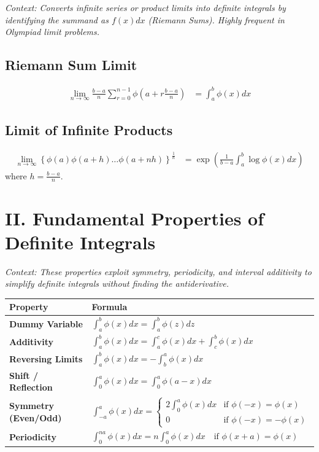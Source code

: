 \documentclass[11pt, a4paper]{article}
\begin{document}
\textit{\small Context: Converts infinite series or product limits into definite integrals by identifying the summand as $f(x)dx$ (Riemann Sums). Highly frequent in Olympiad limit problems.}

\subsection*{\color{secondary} Riemann Sum Limit}
\begin{align*}
    \lim_{n \to \infty} \frac{b-a}{n} \sum_{r=0}^{n-1} \phi\left(a + r\frac{b-a}{n}\right) &= \int_a^b \phi(x) dx
\end{align*}

\subsection*{\color{secondary} Limit of Infinite Products}
\begin{align*}
    \lim_{n \to \infty} \left\{ \phi(a)\phi(a+h)\dots\phi(a+nh) \right\}^{\frac{1}{n}} &= \exp\left( \frac{1}{b-a} \int_a^b \log \phi(x) dx \right)
\end{align*}
where $h = \frac{b-a}{n}$.


\section*{\color{primary} II. Fundamental Properties of Definite Integrals}

\textit{\small Context: These properties exploit symmetry, periodicity, and interval additivity to simplify definite integrals without finding the antiderivative.}

\begin{center}
\begin{tabular}{@{}p{} p{}@{}}
\toprule
\textbf{Property} & \textbf{Formula} \\
\midrule
\textbf{Dummy Variable} & $\int_a^b \phi(x) dx = \int_a^b \phi(z) dz$ \\
\textbf{Additivity} & $\int_a^b \phi(x) dx = \int_a^c \phi(x) dx + \int_c^b \phi(x) dx$ \\
\textbf{Reversing Limits} & $\int_a^b \phi(x) dx = -\int_b^a \phi(x) dx$ \\
\textbf{Shift / Reflection} & $\int_0^a \phi(x) dx = \int_0^a \phi(a-x) dx$ \\
\textbf{Symmetry (Even/Odd)} & $\int_{-a}^a \phi(x) dx = \begin{cases} 2\int_0^a \phi(x) dx & \text{if } \phi(-x) = \phi(x) \\ 0 & \text{if } \phi(-x) = -\phi(x) \end{cases}$ \\
\textbf{Periodicity} & $\int_0^{na} \phi(x) dx = n \int_0^a \phi(x) dx \quad \text{if } \phi(x+a) = \phi(x)$ \\
\bottomrule
\end{tabular}
\end{center}
\end{document}
